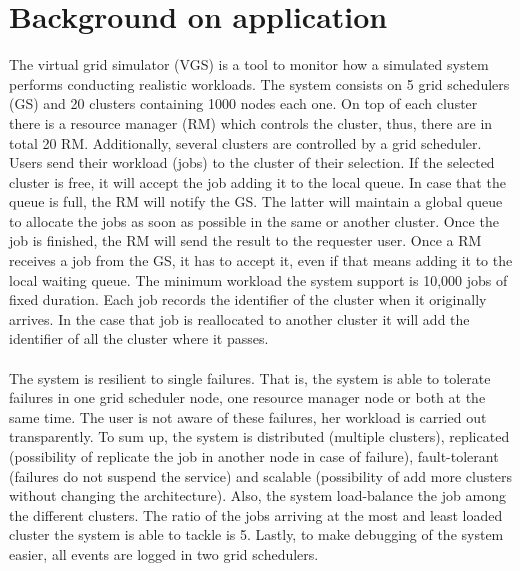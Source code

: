 \section{Background on application}
The virtual grid simulator (VGS) is a tool to monitor how a simulated system performs conducting realistic workloads. The system consists on 5 grid schedulers (GS) and 20 clusters containing 1000 nodes each one. On top of each cluster there is a resource manager (RM) which controls the cluster, thus, there are in total 20 RM. Additionally, several clusters are controlled by a grid scheduler. Users send their workload (jobs) to the cluster of their selection. If the selected cluster is free, it will accept the job adding it to the local queue. In case that the queue is full, the RM will notify the GS. The latter will maintain a global queue to allocate the jobs as soon as possible in the same or another cluster. Once the job is finished, the RM will send the result to the requester user. Once a RM receives a job from the GS, it has to accept it, even if that means adding it to the local waiting queue. The minimum workload the system support is 10,000 jobs of fixed duration. Each job records the identifier of the cluster when it originally arrives. In the case that job is reallocated to another cluster it will add the identifier of all the cluster where it passes.
\\\\
The system is resilient to single failures. That is, the system is able to tolerate failures in one grid scheduler node, one resource manager node or both at the same time. The user is not aware of these failures, her workload is carried out transparently. To sum up, the system is distributed (multiple clusters), replicated (possibility of replicate the job in another node in case of failure), fault-tolerant (failures do not suspend the service) and scalable (possibility of add more clusters without changing the architecture). Also, the system load-balance the job among the different clusters. The ratio of the jobs arriving at the most and least loaded cluster the system is able to tackle is 5. Lastly, to make debugging of the system easier, all events are logged in two grid schedulers.
